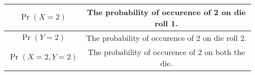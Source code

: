 

\providecommand{\pr}[1]{\ensuremath{\Pr\left(#1\right)}}


\begin{center}
\normalsize \begin{tabular}{|c|c|}
\hline
$\pr{X=2}$ & The probability of occurence of 2 on die roll 1. \\
\hline
$\pr{Y=2}$ & The probability of occurence of 2 on die roll 2. \\ 
\hline
 $\pr{X=2,Y=2}$ & The probability of occurence of 2 on both the die. \\
 \hline
 \end{tabular} 
 \end{center}



